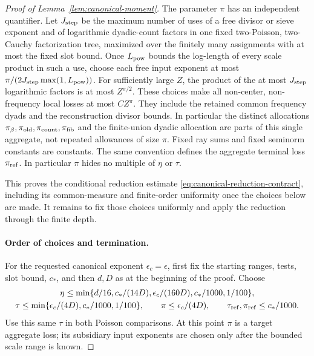 \documentclass[11pt,a4paper]{article}
\numberwithin{equation}{section}
\numberwithin{figure}{section}
\theoremstyle{definition}
\theoremstyle{remark}
\begin{document}
\begin{proof}[Proof of Lemma~\ref{lem:canonical-moment}]
The parameter \(\pi\) has an independent quantifier.  Let \(J_{\rm step}\)
be the maximum number of uses of a free divisor or sieve exponent and
of logarithmic dyadic-count factors in one fixed two-Poisson, two-Cauchy
factorization tree, maximized over the finitely many assignments with at
most the fixed slot bound.  Once \(L_{\rm pow}\) bounds the log-length of
every scale product in such a use, choose each free input exponent at most
\(\pi/(2J_{\rm step}\max(1,L_{\rm pow}))\).  For sufficiently large \(Z\),
the product of the at most \(J_{\rm step}\) logarithmic factors is at most
\(Z^{\pi/2}\).  These choices make all non-center, non-frequency local
losses at most \(CZ^\pi\).  They include the retained common frequency
dyads and the reconstruction divisor bounds.  In particular the distinct
allocations \(\pi_\beta,\pi_{\rm old},\pi_{\rm count},\pi_{\rm fib}\)
and the finite-union dyadic allocation are parts of this single
aggregate, not repeated allowances of size \(\pi\).  Fixed ray sums and fixed
seminorm constants are constants.  The same convention defines the
aggregate terminal loss \(\pi_{\rm ref}\).  In particular \(\pi\) hides
no multiple of \(\eta\) or \(\tau\).

This proves the conditional reduction estimate
\eqref{eq:canonical-reduction-contract}, including its common-measure and
finite-order uniformity once the choices below are made. It remains to fix
those choices uniformly and apply the reduction through the finite depth.

\paragraph{Order of choices and termination.}
For the requested canonical exponent \(\epsilon_c=\epsilon\), first fix
the starting ranges, tests, slot bound, \(c_*\), and then \(d,D\) as at
the beginning of the proof.  Choose
\begin{equation}\label{eq:inverse-parameter-order}
 \begin{gathered}
 \eta\le\min\{d/16,c_*/(14D),\epsilon_c/(160D),c_*/1000,1/100\},\\
 \tau\le\min\{\epsilon_c/(4D),c_*/1000,1/100\},\qquad
 \pi\le\epsilon_c/(4D),\qquad
 \tau_{\rm ref},\pi_{\rm ref}\le c_*/1000.
 \end{gathered}
\end{equation}
Use this same \(\tau\) in both Poisson comparisons.  At this point \(\pi\)
is a target aggregate loss; its subsidiary input exponents are chosen
only after the bounded scale range is known.


\end{proof}
\end{document}
